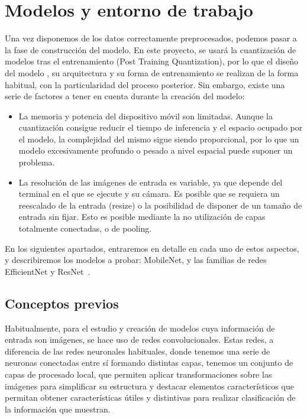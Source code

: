 \chapter{Modelos y entorno de trabajo}

Una vez disponemos de los datos correctamente preprocesados, podemos pasar a la fase de construcción del modelo. En este proyecto, se usará la cuantización de modelos tras el entrenamiento (Post Training Quantization), por lo que el diseño del modelo , su arquitectura y su forma de entrenamiento se realizan de la forma habitual, con la particularidad del proceso posterior. Sin embargo, existe una serie de factores a tener en cuenta durante la creación del modelo:

\begin{itemize}
	\item La memoria y potencia del dispositivo móvil son limitadas. Aunque la cuantización consigue reducir el tiempo de inferencia y el espacio ocupado por el modelo, la complejidad del mismo sigue siendo proporcional, por lo que un modelo excesivamente profundo o pesado a nivel espacial puede suponer un problema.
	\item La resolución de las imágenes de entrada es variable, ya que depende del terminal en el que se ejecute y su cámara. Es posible que se requiera un reescalado de la entrada (resize) o la posibilidad de disponer de un tamaño de entrada sin fijar. Esto es posible mediante la no utilización de capas totalmente conectadas, o de pooling.
\end{itemize}

En los siguientes apartados, entraremos en detalle en cada uno de estos aspectos, y describiremos los modelos a probar: MobileNet, y las familias de redes EfficientNet y ResNet~\cite{DBLP:journals/corr/HeZRS15}.

\section{Conceptos previos}

Habitualmente, para el estudio y creación de modelos cuya información de entrada son imágenes, se hace uso de redes convolucionales. Estas redes, a diferencia de las redes neuronales habituales, donde tenemos una serie de neuronas conectadas entre sí formando distintas capas,  tenemos un conjunto de capas de procesado local, que permiten aplicar transformaciones sobre las imágenes para simplificar su estructura y destacar elementos característicos que permitan obtener características útiles y distintivas para realizar clasificación de la información que muestran.

